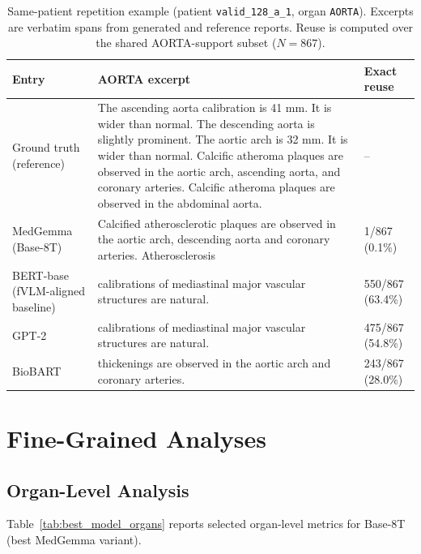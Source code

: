 \begin{table}[htbp]
    \centering
    \small
    \caption{Same-patient repetition example (patient \texttt{valid\_128\_a\_1}, organ \texttt{AORTA}). Excerpts are verbatim spans from generated and reference reports. Reuse is computed over the shared AORTA-support subset ($N=867$).}
    \label{tab:decoder_repetition_example}
    \begin{tabular}{p{2.9cm}p{8.0cm}p{2.2cm}}
        \toprule
        \textbf{Entry} & \textbf{AORTA excerpt} & \textbf{Exact reuse} \\\midrule
        Ground truth (reference) & The ascending aorta calibration is 41 mm. It is wider than normal. The descending aorta is slightly prominent. The aortic arch is 32 mm. It is wider than normal. Calcific atheroma plaques are observed in the aortic arch, ascending aorta, and coronary arteries. Calcific atheroma plaques are observed in the abdominal aorta. & -- \\
        MedGemma (Base-8T) & Calcified atherosclerotic plaques are observed in the aortic arch, descending aorta and coronary arteries. Atherosclerosis & 1/867 (0.1\%) \\
        BERT-base (fVLM-aligned baseline) & calibrations of mediastinal major vascular structures are natural. & 550/867 (63.4\%) \\
        GPT-2 & calibrations of mediastinal major vascular structures are natural. & 475/867 (54.8\%) \\
        BioBART & thickenings are observed in the aortic arch and coronary arteries. & 243/867 (28.0\%) \\
        \bottomrule
    \end{tabular}
\end{table}

\section{Fine-Grained Analyses}\label{sec:exp_fine_grained}
\subsection{Organ-Level Analysis}
Table~\ref{tab:best_model_organs} reports selected organ-level metrics for Base-8T (best MedGemma variant).

